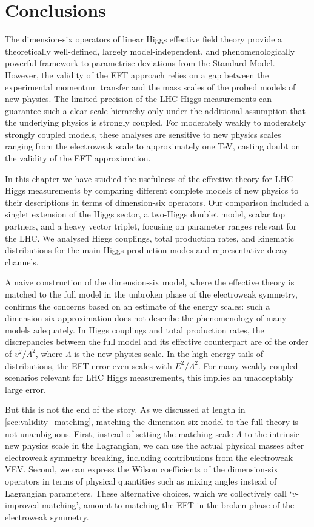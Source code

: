 \section{Conclusions}
\label{sec:validity_conclusions}

The dimension-six operators of linear Higgs effective field theory
provide a theoretically well-defined, largely model-independent, and
phenomenologically powerful framework to parametrise deviations from
the Standard Model. However, the validity of the EFT approach relies
on a gap between the experimental momentum transfer and the mass
scales of the probed models of new physics. The limited precision of
the LHC Higgs measurements can guarantee such a clear scale hierarchy
only under the additional assumption that the underlying physics is
strongly coupled. For moderately weakly to moderately strongly coupled
models, these analyses are sensitive to new physics scales ranging
from the electroweak scale to approximately one TeV, casting doubt on
the validity of the EFT approximation.

In this chapter we have studied the usefulness of the effective theory
for LHC Higgs measurements by comparing different complete models of
new physics to their descriptions in terms of dimension-six
operators. Our comparison included a singlet extension of the Higgs
sector, a two-Higgs doublet model, scalar top partners, and a heavy
vector triplet, focusing on parameter ranges relevant for the LHC. We
analysed Higgs couplings, total production rates, and kinematic
distributions for the main Higgs production modes and representative
decay channels.

A naive construction of the dimension-six model, where the effective
theory is matched to the full model in the unbroken phase of the
electroweak symmetry, confirms the concerns based on an estimate of
the energy scales: such a dimension-six approximation does not
describe the phenomenology of many models adequately. In Higgs
couplings and total production rates, the discrepancies between the
full model and its effective counterpart are of the order of
$v^2 / \Lambda^2$, where $\Lambda$ is the new physics scale. In the
high-energy tails of distributions, the EFT error even scales with
$E^2 / \Lambda^2$. For many weakly coupled scenarios relevant for LHC
Higgs measurements, this implies an unacceptably large error.

But this is not the end of the story. As we discussed at length in
\autoref{sec:validity_matching}, matching the dimension-six model to
the full theory is not unambiguous. First, instead of setting the
matching scale $\Lambda$ to the intrinsic new physics scale in the
Lagrangian, we can use the actual physical masses after electroweak
symmetry breaking, including contributions from the electroweak
VEV. Second, we can express the Wilson coefficients of the
dimension-six operators in terms of physical quantities such as mixing
angles instead of Lagrangian parameters. These alternative choices,
which we collectively call `$v$-improved matching', amount to
matching the EFT in the broken phase of the electroweak symmetry.

